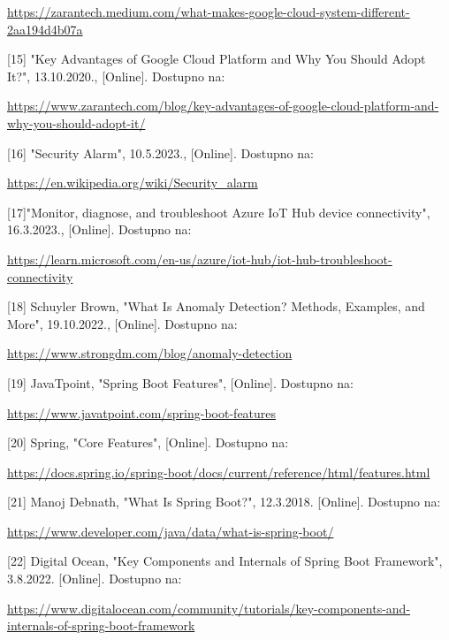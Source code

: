 \documentclass[times, utf8, zavrsni]{fer}
\begin{document}
 \href{https://zarantech.medium.com/what-makes-google-cloud-system-different-2aa194d4b07a}{https://zarantech.medium.com/what-makes-google-cloud-system-different-2aa194d4b07a}

 
[15] "Key Advantages of Google Cloud Platform and Why You Should Adopt It?", 13.10.2020., [Online].
Dostupno na:

 \href{https://www.zarantech.com/blog/key-advantages-of-google-cloud-platform-and-why-you-should-adopt-it/}{https://www.zarantech.com/blog/key-advantages-of-google-cloud-platform-and-why-you-should-adopt-it/}

[16] "Security Alarm", 10.5.2023., [Online].
Dostupno na:

 \href{https://en.wikipedia.org/wiki/Security_alarm}{https://en.wikipedia.org/wiki/Security_alarm}

 
 [17]"Monitor, diagnose, and troubleshoot Azure IoT Hub device connectivity", 16.3.2023., [Online].
Dostupno na:

 \href{https://learn.microsoft.com/en-us/azure/iot-hub/iot-hub-troubleshoot-connectivity}{https://learn.microsoft.com/en-us/azure/iot-hub/iot-hub-troubleshoot-connectivity}

 
 [18] Schuyler Brown, "What Is Anomaly Detection? Methods, Examples, and More", 19.10.2022., [Online].
Dostupno na:

 \href{https://www.strongdm.com/blog/anomaly-detection}{https://www.strongdm.com/blog/anomaly-detection}

 
[19] JavaTpoint, "Spring Boot Features", [Online].
Dostupno na:

\href{https://www.javatpoint.com/spring-boot-features}{https://www.javatpoint.com/spring-boot-features}

[20] Spring, "Core Features", [Online].
Dostupno na:

\href{https://docs.spring.io/spring-boot/docs/current/reference/html/features.html}{https://docs.spring.io/spring-boot/docs/current/reference/html/features.html}

[21] Manoj Debnath, "What Is Spring Boot?", 12.3.2018. [Online].
Dostupno na:

\href{https://www.developer.com/java/data/what-is-spring-boot/}{https://www.developer.com/java/data/what-is-spring-boot/}

[22]  Digital Ocean, "Key Components and Internals of Spring Boot Framework", 3.8.2022. [Online].
Dostupno na:

\href{https://www.digitalocean.com/community/tutorials/key-components-and-internals-of-spring-boot-framework}{https://www.digitalocean.com/community/tutorials/key-components-and-internals-of-spring-boot-framework}
\end{document}
